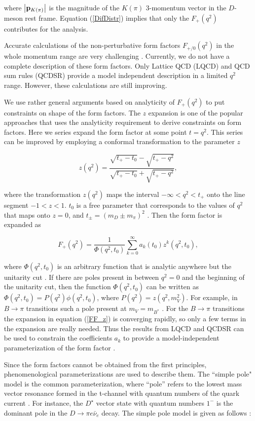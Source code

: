 where $\left|{\bf p}_{K(\pi)}\right|$ is the magnitude of the $K(\pi)$ 3-momentum vector in the $D$-meson rest frame. Equation (\ref{DifDistr}) implies that only the $F_+(q^2)$ contributes for the analysis.\par  
Accurate calculations of the non-perturbative form factors $F_{+/0}(q^2)$ in the whole momentum range are very challenging \cite{Grant:2019yar}. Currently, we do not have a complete description of these form factors. Only Lattice QCD (LQCD)\cite{Aoki:2019cca} and QCD sum rules (QCDSR) \cite{Khodjamirian:2009ys} provide a model independent description in a limited $q^2$ range. However, these calculations are still improving. \par
We use rather general arguments based on analyticity of $F_+(q^2)$ to put constraints on shape of the form factors. The $z$ expansion is one of the popular approaches that uses the analyticity requirement to derive constraints on form factors. Here we series expand the form factor at some point $t=q^2$. This series can be improved by employing a conformal transformation to the parameter $z$

\begin{equation}\label{Zexp}
z(q^2)=\frac{\sqrt{t_+-t_0}-\sqrt{t_+-q^2}}{\sqrt{t_+-t_0}+\sqrt{t_+-q^2}},
\end{equation}

where the transformation $z(q^2)$ maps the interval $-\infty < q^2 < t_+$ onto the line segment $-1<z<1$. $t_0$ is a free parameter that corresponds to the values of $q^2$ that maps onto $z=0$, and $t_{\pm}= (m_D\pm m_\pi)^2$ \cite{Grant:2019yar}. Then the form factor is expanded as 

\begin{equation}\label{FF_z}
F_+(q^2)  =  \frac{1}{\Phi(q^2, t_0)} \sum_{k=0}^\infty a_k(t_0) z^k(q^2,t_0),
\end{equation}

where $\Phi(q^2, t_0)$ is an arbitrary function that is analytic anywhere but the unitarity cut \cite{Grant:2019yar,Boyd:1994tt,Becher:2005bg}. If there are poles present in between $q^2=0$ and the beginning of the unitarity cut, then the function $\Phi(q^2, t_0)$ can be written as $\Phi(q^2, t_0) = P(q^2) \phi(q^2, t_0)$, where $P(q^2) = z(q^2, m_V^2)$. For example, in $B\to \pi$ transitions such a pole present at $m_V=m_{B^*}$ \cite{Ananthanarayan:2011uc,Grinstein:2015wqa}. For the $B\to \pi$ transitions the expansion in equation (\ref{FF_z}) is converging rapidly, so only a few terms in the expansion are really needed. Thus the results from LQCD and QCDSR can be used to constrain the coefficients 
$a_k$ to provide a model-independent parameterization of the form factor \cite{Grant:2019yar}.\par
Since the form factors cannot be obtained from the first principles, phenomenological parameterizations are used to describe them. The  ``simple pole" model is the common parameterization, where ``pole'' refers to the lowest mass vector resonance formed in the t-channel with quantum numbers of the quark current \cite{Grant:2019yar}. For instance, the $D^\star$ vector state with quantum numbers $1^{-}$ is the dominant pole in the $D\to \pi e \bar\nu_e$ decay. The simple pole model is given as follows \cite{Grant:2019yar}:

